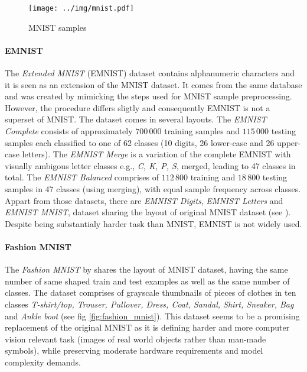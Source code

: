 \begin{figure}
    \centering
    \texttt{[image: ../img/mnist.pdf]}
    \caption{MNIST samples}
    \label{fig:mnist}
\end{figure}

\paragraph{EMNIST}

The \emph{Extended MNIST} (EMNIST) dataset contains alphanumeric characters and it is seen as an extension of the MNIST dataset. It comes from the same database and was created by mimicking the steps used for MNIST sample preprocessing. However, the procedure differs sligtly and consequently EMNIST is not a superset of MNIST. The dataset comes in several layouts. The \emph{EMNIST Complete} consists of approximately $700\,000$ training samples and $115\,000$ testing samples each classified to one of 62 classes (10 digits, 26 lower-case and 26 upper-case letters). The \emph{EMNIST Merge} is a variation of the complete EMNIST with visually ambigous letter classes e.g., \emph{C, K, P, S}, merged, leading to 47 classes in total. The \emph{EMNIST Balanced} comprises of $112\,800$ training and $18\,800$ testing samples in 47 classes (using merging), with equal sample frequency across classes. Appart from those datasets, there are \emph{EMNIST Digits}, \emph{EMNIST Letters} and \emph{EMNIST MNIST}, dataset sharing the layout of original MNIST dataset (see \cite{DBLP:journals/corr/CohenATS17}). Despite being substantialy harder task than MNIST, EMNIST is not widely used.

\paragraph{Fashion MNIST}
\label{sec:fashion_mnist}
The \emph{Fashion MNIST} by \cite{DBLP:journals/corr/abs-1708-07747} shares the layout of MNIST dataset, having the same number of same shaped train and test examples as well as the same number of classes. The dataset comprises of grayscale thumbnails of pieces of clothes in ten classes \emph{T-shirt/top, Trouser, Pullover, Dress, Coat, Sandal, Shirt, Sneaker, Bag} and \emph{Ankle boot} (see fig \ref{fig:fashion_mnist}). This dataset seems to be a promising replacement of the original MNIST as it is defining harder and more computer vision relevant task (images of real world objects rather than man-made symbols), while preserving moderate hardware requirements and model complexity demands.

